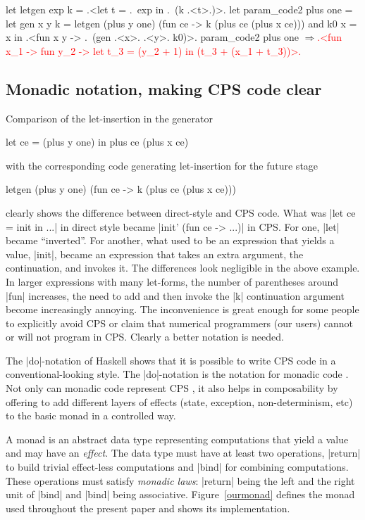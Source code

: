 \documentclass[draft]{elsart}
\newcommand{\evalresult}[1]{\ensuremath{\Longrightarrow}\textcolor{red}{#1}}
\begin{document}
\begin{code}
let letgen exp k = .<let t = .~exp in .~(k .<t>.)>.
let param_code2 plus one =
  let gen x y k = letgen (plus y one)
                         (fun ce -> k (plus ce (plus x ce)))
  and k0 x = x
  in .<fun x y -> .~(gen .<x>. .<y>. k0)>.
param_code2 plus one
\evalresult{.<fun x_1 -> fun y_2 -> let t_3 = (y_2 + 1) in (t_3 + (x_1 + t_3))>.}
\end{code}

\subsection{Monadic notation, making CPS code clear}\label{monadicnotation}

Comparison of the let-insertion in the generator
\begin{code}
let ce = (plus y one) in  plus ce (plus x ce)
\end{code}
with the corresponding code generating let-insertion for the future
stage
\begin{code}
letgen (plus y one) (fun ce -> k (plus ce (plus x ce)))
\end{code}
clearly shows the difference between  direct-style and CPS code.
What was |let ce = init in ...| in direct style became
|init' (fun ce -> ...)| in CPS. For one, |let| became
``inverted''. For another, what used to be an expression that yields
a value, |init|, became an expression that takes an extra argument,
the continuation, and invokes it. The differences look negligible in
the above example. In larger expressions with many let-forms, the
number of parentheses around |fun| increases, the need to add and
then invoke the |k| continuation argument become increasingly annoying. The
inconvenience is great enough for some people to explicitly avoid CPS
or claim that numerical programmers (our users) cannot or will not
program in CPS. Clearly a better notation is needed.

The |do|-notation of Haskell \cite{Haskell98Report} shows that it is possible
to write CPS code in a conventional-looking style. The
|do|-notation is the notation for monadic code \cite{moggi-notions}.
Not only can monadic code represent CPS \cite{Filinski:Representing},
it also helps in composability by offering to add different
layers of effects (state, exception, non-determinism, etc) to the
basic monad \cite{liang-interpreter} in a controlled way.

A monad \cite{moggi-notions} is an abstract data type representing
computations that yield a value and may have an \emph{effect}.
The data type must have at least two operations, |return| to build
trivial effect-less computations and |bind| for combining
computations. These operations must satisfy \emph{monadic laws}:
|return| being the left and the right unit of |bind| and |bind| being
associative. Figure~\ref{ourmonad} defines the monad used throughout
the present paper and shows its implementation.
\end{document}
